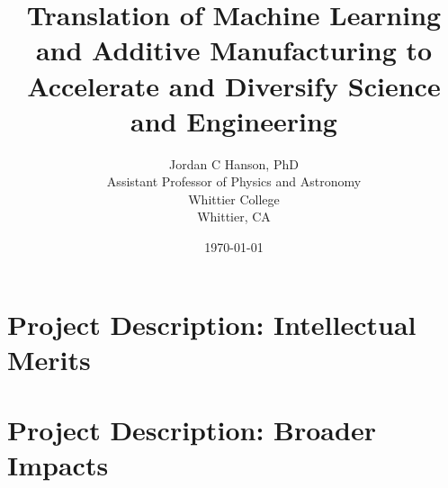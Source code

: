 \documentclass[10pt,twoside,openany]{book}
\title{Translation of Machine Learning and Additive Manufacturing to Accelerate and Diversify Science and Engineering}
\author{Jordan C Hanson, PhD \\ Assistant Professor of Physics and Astronomy \\ Whittier College \\ Whittier, CA}
\date{\today}
\begin{document}
\begin{flushleft}

\end{flushleft}

\begin{flushleft}

\end{flushleft}

\maketitle
\tableofcontents
\thispagestyle{empty}

\chapter{Project Description: Intellectual Merits}
\thispagestyle{empty}
\begin{flushleft}

\end{flushleft}

\chapter{Project Description: Broader Impacts}
\thispagestyle{empty}
\begin{flushleft}

\end{flushleft}

\small


 
\end{document}
